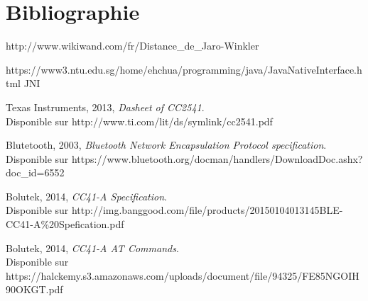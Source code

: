 \chapter*{Bibliographie}

	\noindent
	[1] http://www.wikiwand.com/fr/Distance_de_Jaro-Winkler

	\noindent
	[2] https://www3.ntu.edu.sg/home/ehchua/programming/java/JavaNativeInterface.html JNI

	\noindent
	[3] Texas Instruments, 2013, \emph{Dasheet of CC2541}. \\
	Disponible sur {\footnotesize http://www.ti.com/lit/ds/symlink/cc2541.pdf}
	
	\noindent
	[4] Blutetooth\texttrademark, 2003, 
	\emph{Bluetooth Network Encapsulation Protocol specification}. \\
	Disponible sur 
	{\footnotesize https://www.bluetooth.org/docman/handlers/DownloadDoc.ashx?doc_id=6552}
	
	\noindent 
	[5] Bolutek, 2014, \emph{CC41-A Specification}. \\
	Disponible sur 
	{\footnotesize http://img.banggood.com/file/products/20150104013145BLE-CC41-A\%20Spefication.pdf}
	
	\noindent 
	[6] Bolutek, 2014, \emph{CC41-A AT Commands}. \\
	Disponible sur 
	{\footnotesize https://halckemy.s3.amazonaws.com/uploads/document/file/94325/FE85NGOIH90OKGT.pdf}